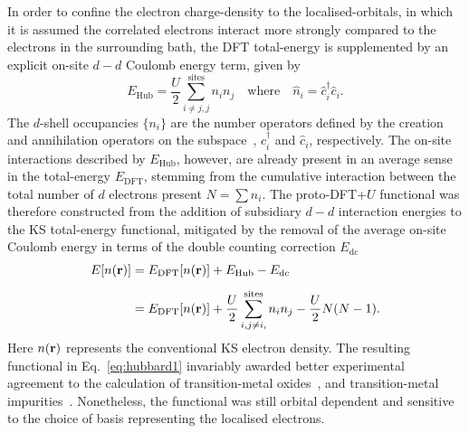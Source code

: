 {In order to confine the electron charge-density 
to the localised-orbitals, 
in which it is assumed 
the correlated electrons interact more strongly 
compared to the electrons in the surrounding bath, 
the DFT total-energy 
is supplemented by an explicit 
on-site $d-d$ Coulomb energy term, 
given by
%
\begin{equation}
E_\textrm{Hub}=\frac{U}{2}\sum_{i\neq j,j}^{\textrm{sites}}n_in_j
{\quad\mbox{where}\quad
\hat{n}_i=\hat{c}_i^\dagger\hat{c}_i}.
\end{equation}
%
{
The $d$-shell occupancies $\{n_i\}$ 
are the number operators 
defined by the creation and annihilation operators 
on the subspace~\cite{PhysRev.124.41}, 
$\hat{c}_i^\dagger$ and $\hat{c}_i$, 
respectively.}
%
The on-site interactions described by $E_\textrm{Hub}$, however, 
are already present in an average sense 
in the total-energy $E_\textrm{DFT}$, 
stemming from the cumulative interaction 
between the total number 
of $d$ electrons present $N=\sum n_i$.
%
The proto-DFT+$U$ functional
was therefore constructed from the addition 
of subsidiary $d-d$ interaction energies 
to the KS total-energy functional,  
mitigated by the removal of the 
average on-site Coulomb energy 
in terms of the double counting correction $E_\textrm{dc}$
%
\begin{align}
E[n({\bf r})]&=E_\textrm{DFT}[n({\bf r})]+E_\textrm{Hub}-E_\textrm{dc}\nonumber\\[0.5em]
&=E_\textrm{DFT}[n({\bf r})]+\frac{U}{2}\sum_{i,j\neq i,}^{\textrm{sites}}n_in_j-\frac{U}{2}N(N-1).
\label{eq:hubbard1}
\end{align}
%
Here $n({\bf r})$ represents 
the conventional KS electron density. 
%
The resulting functional in Eq.~\eqref{eq:hubbard1} 
invariably awarded better 
experimental agreement to the calculation of  
transition-metal oxides~\cite{PhysRevB.44.943,PhysRevB.48.16929},   
and transition-metal impurities~\cite{PhysRevB.49.6736,PhysRevB.50.16861}.
%
Nonetheless, 
the functional was still orbital dependent  
and sensitive to the choice of basis 
representing the localised electrons.

}
